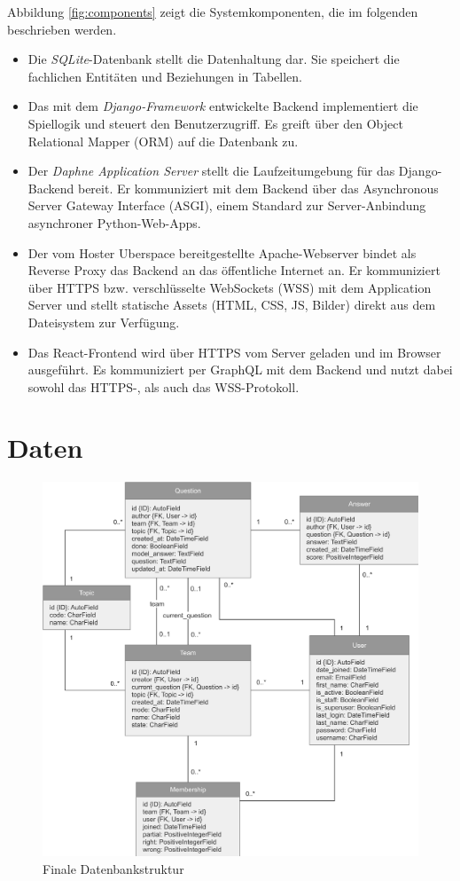 \documentclass[a4paper,11pt,listof=numbered,glossary=totoc,parskip=half,toc=bib]{scrreprt}
\begin{document}
	Abbildung \ref{fig:components} zeigt die Systemkomponenten, die im folgenden beschrieben werden.
	
	\begin{itemize}
		\item Die \textit{SQLite}-Datenbank stellt die Datenhaltung dar. Sie speichert die fachlichen Entitäten und Beziehungen in Tabellen.
		\item Das mit dem \textit{Django-Framework} entwickelte Backend implementiert die Spiellogik und steuert den Benutzerzugriff. Es greift über den Object Relational Mapper (ORM) auf die Datenbank zu.
		\item Der \textit{Daphne Application Server} stellt die Laufzeitumgebung für das Django-Backend bereit. Er kommuniziert mit dem Backend über das Asynchronous Server Gateway Interface (ASGI), einem Standard zur Server-Anbindung asynchroner Python-Web-Apps.
		\item Der vom Hoster Uberspace bereitgestellte Apache-Webserver bindet als Reverse Proxy das Backend an das öffentliche Internet an. Er kommuniziert über HTTPS bzw. verschlüsselte WebSockets (WSS) mit dem Application Server und stellt statische Assets (HTML, CSS, JS, Bilder) direkt aus dem Dateisystem zur Verfügung.
		\item Das React-Frontend wird über HTTPS vom Server geladen und im Browser ausgeführt. Es kommuniziert per GraphQL mit dem Backend und nutzt dabei sowohl das HTTPS-, als auch das WSS-Protokoll.
	\end{itemize}
	
	
	\section{Daten}
	
	\begin{figure}
		\centering
		\includegraphics[width=\textwidth]{UML_Datenmodell}
		\caption{Finale Datenbankstruktur}
		\label{fig:database}
	\end{figure}
\end{document}

